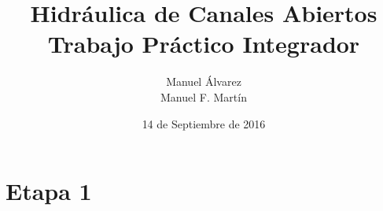 \documentclass[10.5pt]{article}
\begin{document}
\date{14 de Septiembre de 2016}
\title{Hidráulica de Canales Abiertos\\Trabajo Práctico Integrador}
\author{Manuel Álvarez\\Manuel F. Martín}

\maketitle


\section{Etapa 1}

\subsection{}
\end{document}
